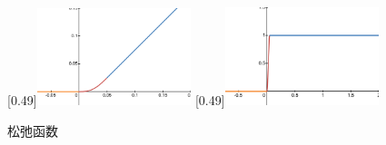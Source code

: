\documentclass[master,academic]{ysuthesis} %
\begin{document}
		\begin{figure}[!ht]
			\centering
			[0.49\textwidth]{\includegraphics[width=0.4\textwidth]{松弛函数.png}}
			[0.49\textwidth]{\includegraphics[width=0.4\textwidth]{松弛导数.png}}
			\caption{松弛函数}
			\label{fig:松弛函数图}
		\end{figure}
\end{document}
